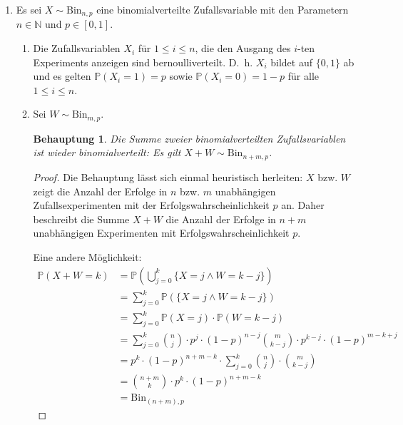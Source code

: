\documentclass[a4paper]{scrartcl}
\newtheorem*{behaupt}{Behauptung}
\newcommand{\prob}{\mathbb{P}}
\begin{document}
\begin{enumerate}[label=\bfseries 1.\arabic*]
    \item
        Es sei $X \sim \text{Bin}_{n,p}$ eine binomialverteilte Zufallsvariable
        mit den Parametern $n \in \mathbb{N}$ und $p \in [0,1]$.
        \begin{enumerate}[label=\alph*)]
            \item
                Die Zufallsvariablen $X_i$ für $1 \leq i \leq n$, die den
                Ausgang des $i$-ten Experiments anzeigen sind
                bernoulliverteilt.  D.~h. $X_i$ bildet auf $\{0,1\}$ ab und es
                gelten $\prob(X_i=1) = p$ sowie $\prob(X_i=0) = 1-p$
                für alle $1 \leq i \leq n$.

            \item
                Sei $W \sim \text{Bin}_{m,p}$.

                \begin{behaupt}
                    Die Summe zweier binomialverteilten Zufallsvariablen ist
                    wieder binomialverteilt:
                    Es gilt $X + W \sim \text{Bin}_{n+m,p}$.
                \end{behaupt}
                \begin{proof}
                    Die Behauptung lässt sich einmal heuristisch herleiten: $X$
                    bzw. $W$ zeigt die Anzahl der Erfolge in $n$ bzw. $m$
                    unabhängigen Zufallsexperimenten mit der
                    Erfolgswahrscheinlichkeit $p$ an. Daher beschreibt die
                    Summe $X + W$ die Anzahl der Erfolge in $n+m$ unabhängigen
                    Experimenten mit Erfolgswahrscheinlichkeit $p$.

                    Eine andere Möglichkeit:
                    \begin{equation*}
                        \begin{split}
                            \prob(X+W=k)
                            &= \prob \left( \bigcup_{j=0}^k \{X=j \land W=k-j\}
                            \right) \\
                            &= \sum_{j=0}^k \prob (\{X=j \land W=k-j\}) \\
                            &= \sum_{j=0}^k \prob (X=j) \cdot \prob(W=k-j) \\
                            &= \sum_{j=0}^k
                            \binom{n}{j} \cdot p^j \cdot (1-p)^{n-j}
                            \binom{m}{k-j} \cdot p^{k-j} \cdot (1-p)^{m-k+j} \\
                            &= p^k \cdot (1-p)^{n+m-k} \cdot
                            \sum_{j=0}^k \binom{n}{j} \cdot \binom{m}{k-j} \\
                            &= \binom{n+m}{k} \cdot p^k \cdot (1-p)^{n+m-k} \\
                            &= \text{Bin}_{(n+m),p}
                        \end{split}
                    \end{equation*}
                \end{proof}


\end{enumerate}
\end{enumerate}
\end{document}
